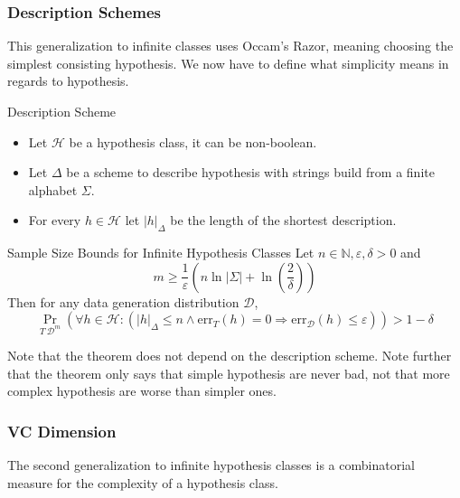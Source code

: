 \documentclass[english]{panikzettel}
\begin{document}
\subsubsection{Description Schemes}
This generalization to infinite classes uses Occam's Razor, meaning choosing the simplest consisting hypothesis. We now have to define what simplicity means in regards to hypothesis.

\begin{defi}{Description Scheme}
\begin{itemize}
	\item Let $\mathcal{H}$ be a hypothesis class, it can be non-boolean.
	\item Let $\Delta$ be a scheme to describe hypothesis with strings build from a finite alphabet $\Sigma$.
	\item For every $h \in \mathcal{H}$ let $|h|_\Delta$ be the length of the shortest description.
\end{itemize}
\end{defi}

\begin{theo}{Sample Size Bounds for Infinite Hypothesis Classes}
Let $n \in \mathbb{N}, \varepsilon, \delta > 0$ and
$$
m \geq \frac{1}{\varepsilon}\left( n \ln |\Sigma| + \ln(\frac{2}{\delta}) \right)
$$
Then for any data generation distribution $\mathcal{D}$,
$$
\Pr_{T ~ \mathcal{D}^m}(\forall h \in \mathcal{H}: (|h|_\Delta \leq n \land \text{err}_T(h) = 0 \Rightarrow \text{err}_\mathcal{D}(h) \leq \varepsilon)) > 1 - \delta
$$
\end{theo}

Note that the theorem does not depend on the description scheme. Note further that the theorem only says that simple hypothesis are never bad, not that more complex hypothesis are worse than simpler ones.

\subsubsection{VC Dimension}
The second generalization to infinite hypothesis classes is a combinatorial measure for the complexity of a hypothesis class.
\end{document}
